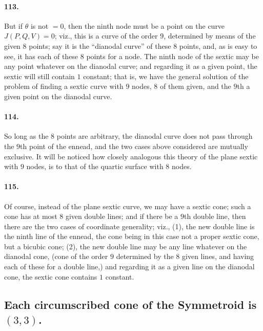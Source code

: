 \documentclass[11pt,a4paper]{article}
\begin{document}
\paragraph{113.}
But if $\theta$ is not $= 0$, then the ninth node must be a point on the
curve $J(P, Q, V) = 0$; viz., this is a curve of the order $9$, determined
by means of the given $8$ points; say it is the ``dianodal curve'' of
these $8$ points, and, as is easy to see, it has each of these $8$ points
for a node. The ninth node of the sextic may be any point whatever on the
dianodal curve; and regarding it as a given point, the sextic will still
contain $1$ constant; that is, we have the general solution of the problem
of finding a sextic curve with $9$ nodes, $8$ of them given, and the
$9$th a given point on the dianodal curve.

\paragraph{114.}
So long as the $8$ points are arbitrary, the dianodal curve does not pass
through the $9$th point of the ennead, and the two cases above considered
are mutually exclusive. It will be noticed how closely analogous this
theory of the plane sextic with $9$ nodes, is to that of the quartic
surface with $8$ nodes.

\paragraph{115.}
Of course, instead of the plane sextic curve, we may have a sextic cone;
such a cone has at most $8$ given double lines; and if there be a $9$th
double line, then there are the two cases of coordinate generality; viz.,
(1), the new double line is the ninth line of the ennead, the cone being
in this case not a proper sextic cone, but a bicubic cone; (2), the new
double line may be any line whatever on the dianodal cone, (cone of the
order $9$ determined by the $8$ given lines, and having each of these for
a double line,) and regarding it as a given line on the dianodal cone, the
sextic cone contains $1$ constant.

\subsection*{Each circumscribed cone of the Symmetroid is $(3, 3)$.}
\end{document}
